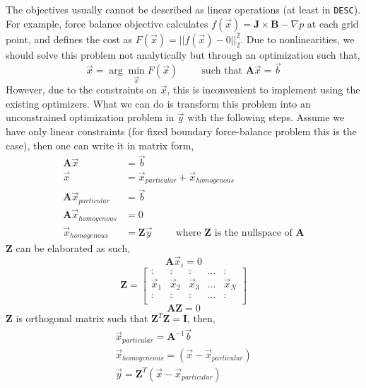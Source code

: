 The objectives usually cannot be described as linear operations (at least in \texttt{DESC}). For example, force balance objective calculates $f(\Vec{x})=\textbf{J}\times\textbf{B}-\nabla p$ at each grid point, and defines the cost as $F(\Vec{x})=||f(\Vec{x})-0||_2^2$. Due to nonlinearities, we should solve this problem not analytically but through an optimization such that,
\begin{equation}
    \Vec{x} = \arg \min_{\Vec{x}} F(\Vec{x}) \hspace{1cm} \text{such that } \mathbf{A}\Vec{x} = \Vec{b}
\end{equation}
However, due to the constraints on $\Vec{x}$, this is inconvenient to implement using the existing optimizers. What we can do is transform this problem into an unconstrained optimization problem in $\Vec{y}$ with the following steps. Assume we have only linear constraints (for fixed boundary force-balance problem this is the case), then one can write it in matrix form,
\begin{align*}
    \mathbf{A}\Vec{x} &= \Vec{b} \\
    \Vec{x} &= \Vec{x}_{particular} + \Vec{x}_{homogenous} \\
    \mathbf{A}\Vec{x}_{particular} &= \Vec{b} \\
    \mathbf{A}\Vec{x}_{homogenous} &= 0 \\
    \Vec{x}_{homogenous} &= \mathbf{Z}\Vec{y} \hspace{1cm} \text{where $\mathbf{Z}$ is the nullspace of $\mathbf{A}$}
\end{align*}
$\mathbf{Z}$ can be elaborated as such,
\begin{equation*}
    \mathbf{A}\Vec{x}_i = 0 
\end{equation*}
\begin{equation*}
    \mathbf{Z} = \begin{bmatrix}
        : & : & : & ... & : \\
        \Vec{x}_1 & \Vec{x}_2 & \Vec{x}_3 & ... & \Vec{x}_N \\
        : & : & : & ... & :\\
    \end{bmatrix}
\end{equation*}
\begin{equation*}
    \mathbf{A}\mathbf{Z} = 0 
\end{equation*}
$\mathbf{Z}$ is orthogonal matrix such that $\mathbf{Z}^T\mathbf{Z}=\mathbf{I}$, then, 
\begin{align*}
    \Vec{x}_{particular} = \mathbf{A}^{-1}\Vec{b}\\
    \Vec{x}_{homogeneous} = (\Vec{x} - \Vec{x}_{particular})\\
    \Vec{y} = \mathbf{Z}^T (\Vec{x} - \Vec{x}_{particular})
\end{align*}

